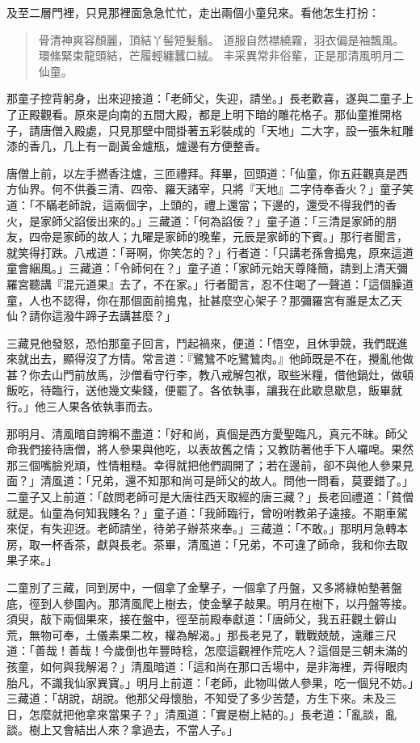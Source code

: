 及至二層門裡，只見那裡面急急忙忙，走出兩個小童兒來。看他怎生打扮：
\begin{quote}
骨清神爽容顏麗，頂結丫髻短髮鬅。
道服自然襟繞霧，羽衣偏是袖飄風。
環絛緊束龍頭結，芒履輕纏蠶口絨。
丰采異常非俗輩，正是那清風明月二仙童。
\end{quote}

那童子控背躬身，出來迎接道：「老師父，失迎，請坐。」長老歡喜，遂與二童子上了正殿觀看。原來是向南的五間大殿，都是上明下暗的雕花格子。那仙童推開格子，請唐僧入殿處，只見那壁中間掛著五彩裝成的「天地」二大字，設一張朱紅雕漆的香几，几上有一副黃金爐瓶，爐邊有方便整香。

唐僧上前，以左手撚香注爐，三匝禮拜。拜畢，回頭道：「仙童，你五莊觀真是西方仙界。何不供養三清、四帝、羅天諸宰，只將『天地』二字侍奉香火？」童子笑道：「不瞞老師說，這兩個字，上頭的，禮上還當；下邊的，還受不得我們的香火，是家師父諂佞出來的。」三藏道：「何為諂佞？」童子道：「三清是家師的朋友，四帝是家師的故人；九曜是家師的晚輩，元辰是家師的下賓。」那行者聞言，就笑得打跌。八戒道：「哥啊，你笑怎的？」行者道：「只講老孫會搗鬼，原來這道童會綑風。」三藏道：「令師何在？」童子道：「家師元始天尊降簡，請到上清天彌羅宮聽講『混元道果』去了，不在家。」行者聞言，忍不住喝了一聲道：「這個臊道童，人也不認得，你在那個面前搗鬼，扯甚麼空心架子？那彌羅宮有誰是太乙天仙？請你這潑牛蹄子去講甚麼？」

三藏見他發怒，恐怕那童子回言，鬥起禍來，便道：「悟空，且休爭競，我們既進來就出去，顯得沒了方情。常言道：『鷺鷥不吃鷺鷥肉。』他師既是不在，攪亂他做甚？你去山門前放馬，沙僧看守行李，教八戒解包袱，取些米糧，借他鍋灶，做頓飯吃，待臨行，送他幾文柴錢，便罷了。各依執事，讓我在此歇息歇息，飯畢就行。」他三人果各依執事而去。

那明月、清風暗自誇稱不盡道：「好和尚，真個是西方愛聖臨凡，真元不昧。師父命我們接待唐僧，將人參果與他吃，以表故舊之情；又教防著他手下人囉唣。果然那三個嘴臉兇頑，性情粗糙。幸得就把他們調開了；若在邊前，卻不與他人參果見面？」清風道：「兄弟，還不知那和尚可是師父的故人。問他一問看，莫要錯了。」二童子又上前道：「啟問老師可是大唐往西天取經的唐三藏？」長老回禮道：「貧僧就是。仙童為何知我賤名？」童子道：「我師臨行，曾吩咐教弟子遠接。不期車駕來促，有失迎迓。老師請坐，待弟子辦茶來奉。」三藏道：「不敢。」那明月急轉本房，取一杯香茶，獻與長老。茶畢，清風道：「兄弟，不可違了師命，我和你去取果子來。」

二童別了三藏，同到房中，一個拿了金擊子，一個拿了丹盤，又多將綠帕墊著盤底，徑到人參園內。那清風爬上樹去，使金擊子敲果。明月在樹下，以丹盤等接。須臾，敲下兩個果來，接在盤中，徑至前殿奉獻道：「唐師父，我五莊觀土僻山荒，無物可奉，土儀素果二枚，權為解渴。」那長老見了，戰戰兢兢，遠離三尺道：「善哉！善哉！今歲倒也年豐時稔，怎麼這觀裡作荒吃人？這個是三朝未滿的孩童，如何與我解渴？」清風暗道：「這和尚在那口舌場中，是非海裡，弄得眼肉胎凡，不識我仙家異寶。」明月上前道：「老師，此物叫做人參果，吃一個兒不妨。」三藏道：「胡說，胡說。他那父母懷胎，不知受了多少苦楚，方生下來。未及三日，怎麼就把他拿來當果子？」清風道：「實是樹上結的。」長老道：「亂談，亂談。樹上又會結出人來？拿過去，不當人子。」

